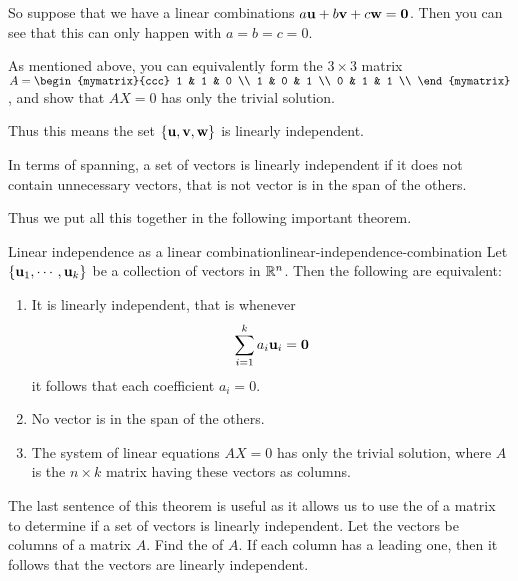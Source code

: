 \begin{solution}
So suppose that we have a linear combinations $a\mbox{\bf u} + b \mbox{\bf v}
+ c\mbox{\bf w} = \mbox{\bf 0}$. Then you can see that this can only happen
with $a=b=c=0$.

As mentioned above, you can equivalently form the $3 \times 3$ matrix $A = 
\begin{mymatrix}{ccc}
1  & 1 & 0 \\
1  & 0 & 1 \\
0  & 1 & 1 \\
\end{mymatrix}$, and show that $AX=0$ has only the trivial solution.

Thus this  means the set $\left\{\mbox{\bf u}, \mbox{\bf v}, \mbox{\bf w} \right\}$ is linearly independent. 
\end{solution}

In terms of spanning, a set of vectors is linearly independent if it
does not contain unnecessary vectors, that is not vector is in the span of the others.

Thus we put all this together in the following important theorem.

\begin{theorem}{Linear independence as a linear combination}{linear-independence-combination}
Let $\left\{\mbox{\bf u}_{1},\cdots ,\mbox{\bf u}_{k}\right\}$ be a collection of vectors  in
$\mathbb{R}^{n}$. Then the following are equivalent:

\begin{enumerate}
\item It is linearly independent, that is whenever
\begin{equation*}
\sum_{i=1}^{k}a_{i}\mbox{\bf u}_{i}=\mbox{\bf 0}
\end{equation*}
it follows that each coefficient $a_{i}=0$.
\item No vector is in the span of the others.
\item The system of
linear equations $AX=0$ has only the trivial solution, where $A$ is
the $n \times k$ matrix having these vectors as columns. 
\end{enumerate}
\end{theorem}

The last sentence of this theorem is useful as it allows us to use the
{\rref} of a matrix to determine if a set of vectors is linearly
independent. Let the vectors be columns of a matrix $A$. Find the
{\rref} of $A$. If each column has a leading one, then it follows
that the vectors are linearly independent.


